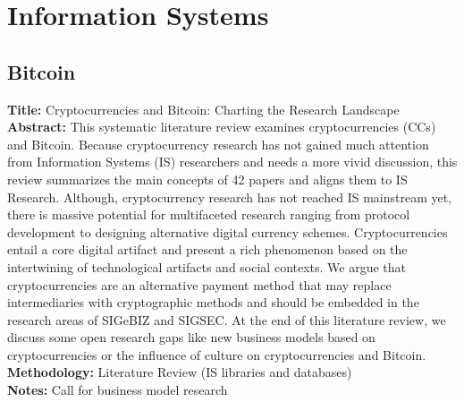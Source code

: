 \documentclass[a4paper, 12pt]{scrartcl}
\begin{document}
\section{Information Systems}

\subsection{Bitcoin}

\textbf{Title:} Cryptocurrencies and Bitcoin: Charting the Research Landscape \parencite{morisse2015cryptocurrencies} \\
\textbf{Abstract:} This systematic literature review examines cryptocurrencies (CCs) and Bitcoin. Because cryptocurrency
research has not gained much attention from Information Systems (IS) researchers and needs a more
vivid discussion, this review summarizes the main concepts of 42 papers and aligns them to IS Research.
Although, cryptocurrency research has not reached IS mainstream yet, there is massive potential for
multifaceted research ranging from protocol development to designing alternative digital currency
schemes. Cryptocurrencies entail a core digital artifact and present a rich phenomenon based on the
intertwining of technological artifacts and social contexts. We argue that cryptocurrencies are an
alternative payment method that may replace intermediaries with cryptographic methods and should be
embedded in the research areas of SIGeBIZ and SIGSEC. At the end of this literature review, we discuss
some open research gaps like new business models based on cryptocurrencies or the influence of culture
on cryptocurrencies and Bitcoin.\\
\textbf{Methodology:} Literature Review (IS libraries and databases) \\
\textbf{Notes:} Call for business model research
\end{document}
